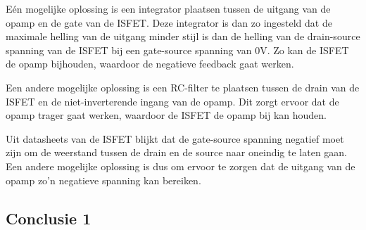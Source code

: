 Eén mogelijke oplossing is een integrator plaatsen tussen de uitgang van de opamp en de gate van de ISFET. Deze integrator is dan zo ingesteld dat de maximale helling van de uitgang minder stijl is dan de helling van de drain-source spanning van de ISFET bij een gate-source spanning van 0V. Zo kan de ISFET de opamp bijhouden, waardoor de negatieve feedback gaat werken.

Een andere mogelijke oplossing is een RC-filter te plaatsen tussen de drain van de ISFET en de niet-inverterende ingang van de opamp. Dit zorgt ervoor dat de opamp trager gaat werken, waardoor de ISFET de opamp bij kan houden.

Uit datasheets van de ISFET blijkt dat de gate-source spanning negatief moet zijn om de weerstand tussen de drain en de source naar oneindig te laten gaan. Een andere mogelijke oplossing is dus om ervoor te zorgen dat de uitgang van de opamp zo'n negatieve spanning kan bereiken.



\subsection{Conclusie 1}
